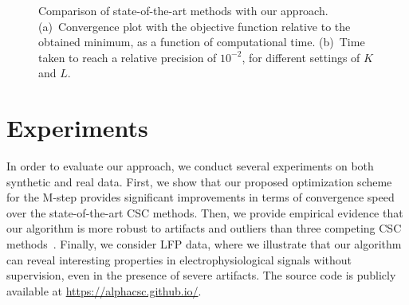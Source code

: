 

\begin{figure}[t]
    \centering
    \caption[Comparison of state-of-the-art methods with our approach.]{Comparison of state-of-the-art methods with our approach. (a)~Convergence plot with the objective function relative to the obtained minimum, as a function of computational time. (b)~Time taken to reach a relative precision of $10^{-2}$, for different settings of $K$ and $L$.  }
    \label{fig:convergence}
\end{figure}

\section{Experiments}
\label{sec:experiments}
In order to evaluate our approach, we conduct several experiments on both synthetic and real data. 
First, we show that our proposed optimization scheme for the M-step provides significant improvements in terms
of convergence speed over the state-of-the-art CSC methods. Then, we provide empirical evidence that our algorithm is more robust to
artifacts and outliers than three competing CSC methods~\citep{jost2006motif,brockmeier2016learning,wohlberg2016efficient}.
%
Finally, we consider LFP data, where we illustrate that our algorithm can reveal interesting properties in electrophysiological signals
without supervision, even in the presence of severe artifacts. The source code is publicly available at \url{https://alphacsc.github.io/}.





